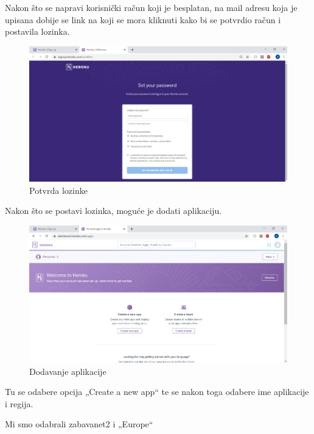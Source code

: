 \normalfont Nakon što se napravi korisnički račun koji je besplatan, na mail adresu koja je upisana dobije se link na koji se mora kliknuti kako bi se potvrdio račun i postavila lozinka.

\begin{figure}[H]
	\includegraphics[scale=0.4]{slike/potvrda_lozinke.PNG}
	\centering
	\caption{Potvrda lozinke}
	\label{fig:pogon2}
\end{figure}

\normalfont Nakon što se postavi lozinka, moguće je dodati aplikaciju.

\begin{figure}[H]
	\includegraphics[scale=0.4]{slike/dodavanje_aplikacije.PNG}
	\centering
	\caption{Dodavanje aplikacije}
	\label{fig:pogon3}
\end{figure}

\normalfont Tu se odabere opcija „Create a new app“ te se nakon toga odabere ime aplikacije i regija.

\normalfont Mi smo odabrali zabavanet2 i „Europe“


